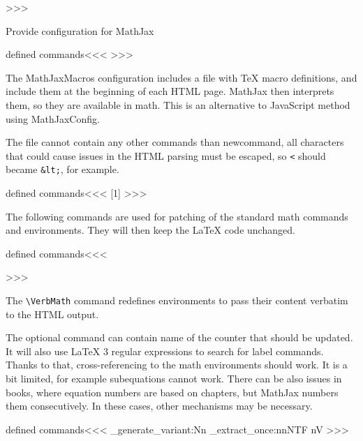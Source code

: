 >>>

Provide configuration for MathJax

\<defined commands\><<<
>>>

The MathJaxMacros configuration includes a file with TeX macro 
definitions, and include them at the beginning of each HTML page.
MathJax then interprets them, so they are available in math. 
This is an alternative to JavaScript method using MathJaxConfig.

The file cannot contain any other commands than newcommand,
all characters that could cause issues in the HTML parsing must
be escaped, so \verb|<| should became \verb|&lt;|, for example.

\<defined commands\><<<
[1]{%
%
}
>>>

The following commands are used for patching of the standard math commands and
environments. They will then keep the LaTeX code unchanged.

\<defined commands\><<<

\long\def\AltlMath#1\){\expandafter\alteqtoks{\(#1\)}\)}
\long{}
\long{}
\long{}

\newcommand\VerbMathToks[2]{%
  \alteqtoks{\begin{#2}
    #1
  \end{#2}}%
}
>>>

The \verb|\VerbMath| command redefines environments to pass their content
verbatim to the HTML output.

The optional command can contain name of the counter that should be updated.
It will also use LaTeX 3 regular expressions to search for label commands.
Thanks to that, cross-referencing to the math environments should work.
It is a bit limited, for example subequations cannot work. There can be also
issues in books, where equation numbers are based on chapters, but MathJax
numbers them consecutively. In these cases, other mechanisms may be necessary.

\<defined commands\><<<
\ExplSyntaxOn
\cs_generate_variant:Nn \regex_extract_once:nnNTF {nV}
\newcommand\VerbMath[2][]{%
  \cs_if_exist:cTF{#2}{
    \RenewDocumentEnvironment{#2}{+!b}{%
      \NoFonts\expandafter\VerbMathToks\expandafter{\detokenize{##1}}{#2}\EndNoFonts%
      \ifx\relax#1\relax\else%
      \refstepcounter{#1}%
      \regex_extract_once:nVNTF { label\s* \x{7B}([^\x{7D}]*)\x{7D}} {\l_tmpb_tl} \l_tmp_seq {\label{\seq_item:Nn\l_tmp_seq{2}}} {}%
      \fi
    }{}
  }{}%
}
\ExplSyntaxOff
>>>

